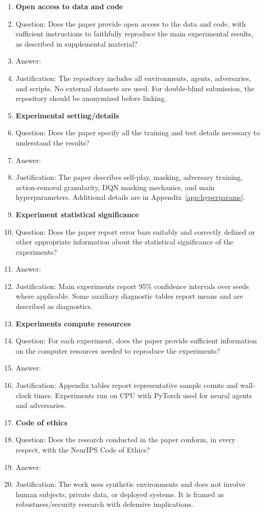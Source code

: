\begin{enumerate}
\item {\bf Open access to data and code}
    \item[] Question: Does the paper provide open access to the data and code, with sufficient instructions to faithfully reproduce the main experimental results, as described in supplemental material?
    \item[] Answer: \answerYes{}
    \item[] Justification: The repository includes all environments, agents, adversaries, and scripts. No external datasets are used. For double-blind submission, the repository should be anonymized before linking.

\item {\bf Experimental setting/details}
    \item[] Question: Does the paper specify all the training and test details necessary to understand the results?
    \item[] Answer: \answerYes{}
    \item[] Justification: The paper describes self-play, masking, adversary training, action-removal granularity, DQN masking mechanics, and main hyperparameters. Additional details are in Appendix~\ref{app:hyperparams}.

\item {\bf Experiment statistical significance}
    \item[] Question: Does the paper report error bars suitably and correctly defined or other appropriate information about the statistical significance of the experiments?
    \item[] Answer: \answerYes{}
    \item[] Justification: Main experiments report 95\% confidence intervals over seeds where applicable. Some auxiliary diagnostic tables report means and are described as diagnostics.

\item {\bf Experiments compute resources}
    \item[] Question: For each experiment, does the paper provide sufficient information on the computer resources needed to reproduce the experiments?
    \item[] Answer: \answerYes{}
    \item[] Justification: Appendix tables report representative sample counts and wall-clock times. Experiments run on CPU with PyTorch used for neural agents and adversaries.

\item {\bf Code of ethics}
    \item[] Question: Does the research conducted in the paper conform, in every respect, with the NeurIPS Code of Ethics?
    \item[] Answer: \answerYes{}
    \item[] Justification: The work uses synthetic environments and does not involve human subjects, private data, or deployed systems. It is framed as robustness/security research with defensive implications.


\end{enumerate}
